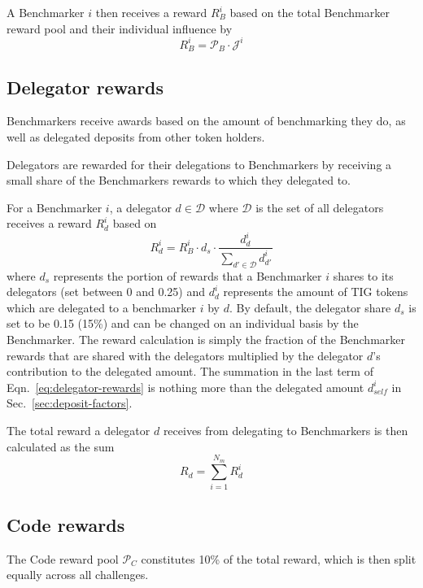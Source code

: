 \documentclass{contract}
\numberwithin{equation}{section}
\begin{document}
A Benchmarker $i$ then receives a reward $R_B^i$ based on the total Benchmarker reward pool and their individual influence by
\begin{equation}
    R_B^i = \mathcal{P}_B \cdot \mathcal{J}^i
\end{equation}

\subsection{Delegator rewards}
\label{sec:delegator-rewards}
Benchmarkers receive awards based on the amount of benchmarking they do, as well as delegated deposits from other token holders.

Delegators are rewarded for their delegations to Benchmarkers by receiving a small share of the Benchmarkers rewards to which they delegated to.

For a Benchmarker $i$, a delegator $d \in \mathcal{D}$ where $\mathcal{D}$ is the set of all delegators receives a reward $R^i_d$ based on
\begin{equation}
    R_d^i = R^i_B\cdot d_s \cdot \frac{d^i_{d}}{\sum_{d'\in\mathcal{D}} d^i_{d'}}
    \label{eq:delegator-rewards}
\end{equation}
where $d_s$ represents the portion of rewards that a Benchmarker $i$ shares to its delegators (set between 0 and 0.25) and $d^i_d$ represents the amount of TIG tokens which are delegated to a benchmarker $i$ by $d$.
By default, the delegator share $d_s$ is set to be 0.15 (15\%) and can be changed on an individual basis by the Benchmarker.
The reward calculation is simply the fraction of the Benchmarker rewards that are shared with the delegators multiplied by the delegator $d$'s contribution to the delegated amount.
The summation in the last term of Eqn.~\ref{eq:delegator-rewards} is nothing more than the delegated amount $d^i_{self}$ in Sec.~\ref{sec:deposit-factors}.

The total reward a delegator $d$ receives from delegating to Benchmarkers is then calculated as the sum
\begin{equation}
    R_d = \sum_{i=1}^{N_m} R^i_d
\end{equation}

\subsection{Code rewards}
\label{sec:code-rewards}

The Code reward pool $\mathcal{P}_C$ constitutes 10\% of the total reward, which is then split equally across all challenges.
\end{document}
